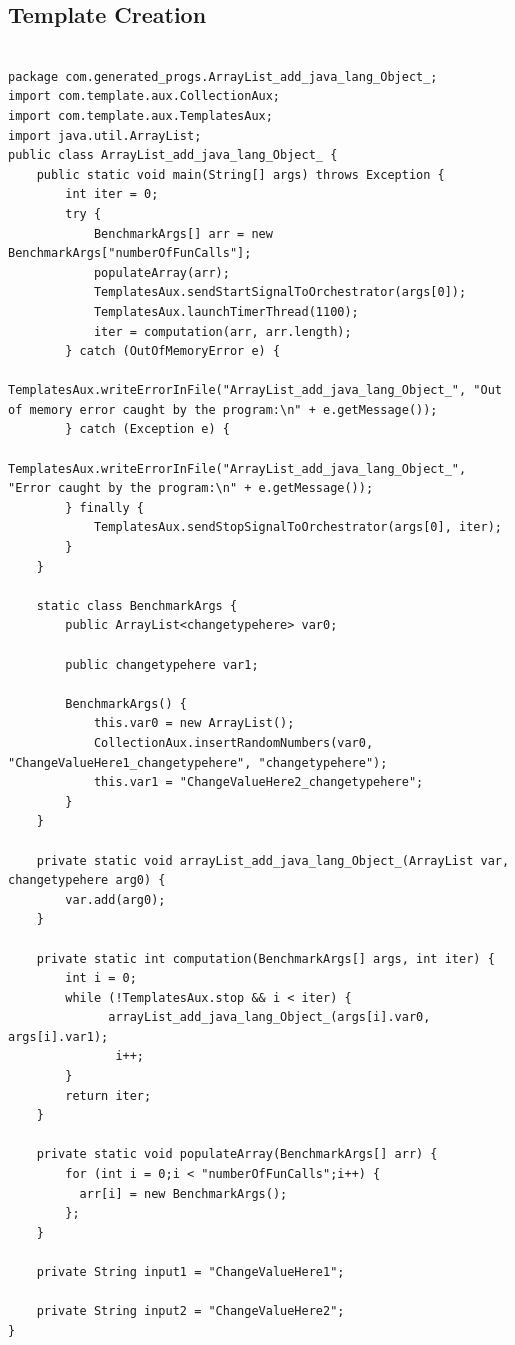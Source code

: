 \subsection{Template Creation} \label{sec:work_stage1_template_creation}


\FloatBarrier


\begin{verbatim}

package com.generated_progs.ArrayList_add_java_lang_Object_;
import com.template.aux.CollectionAux;
import com.template.aux.TemplatesAux;
import java.util.ArrayList;
public class ArrayList_add_java_lang_Object_ {
    public static void main(String[] args) throws Exception {
        int iter = 0;
        try {
            BenchmarkArgs[] arr = new BenchmarkArgs["numberOfFunCalls"];
            populateArray(arr);
            TemplatesAux.sendStartSignalToOrchestrator(args[0]);
            TemplatesAux.launchTimerThread(1100);
            iter = computation(arr, arr.length);
        } catch (OutOfMemoryError e) {
            TemplatesAux.writeErrorInFile("ArrayList_add_java_lang_Object_", "Out of memory error caught by the program:\n" + e.getMessage());
        } catch (Exception e) {
            TemplatesAux.writeErrorInFile("ArrayList_add_java_lang_Object_", "Error caught by the program:\n" + e.getMessage());
        } finally {
            TemplatesAux.sendStopSignalToOrchestrator(args[0], iter);
        }
    }

    static class BenchmarkArgs {
        public ArrayList<changetypehere> var0;

        public changetypehere var1;

        BenchmarkArgs() {
            this.var0 = new ArrayList();
            CollectionAux.insertRandomNumbers(var0, "ChangeValueHere1_changetypehere", "changetypehere");
            this.var1 = "ChangeValueHere2_changetypehere";
        }
    }

    private static void arrayList_add_java_lang_Object_(ArrayList var, changetypehere arg0) {
        var.add(arg0);
    }

    private static int computation(BenchmarkArgs[] args, int iter) {
        int i = 0;
        while (!TemplatesAux.stop && i < iter) {
              arrayList_add_java_lang_Object_(args[i].var0, args[i].var1);
               i++;
        }
        return iter;
    }

    private static void populateArray(BenchmarkArgs[] arr) {
        for (int i = 0;i < "numberOfFunCalls";i++) {
          arr[i] = new BenchmarkArgs();
        };
    }

    private String input1 = "ChangeValueHere1";

    private String input2 = "ChangeValueHere2";
}


\end{verbatim}


